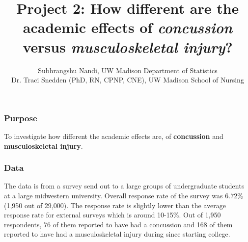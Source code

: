 \documentclass[12]{article}
\begin{document}

\doublespacing

\title{Project 2: How different are the academic effects of {\emph{concussion}} versus {\emph{musculoskeletal injury}}?}
\author{Subhrangshu Nandi, UW Madison Department of Statistics \\
Dr. Traci Snedden (PhD, RN, CPNP, CNE), UW Madison School of Nursing
}
\maketitle
\subsubsection*{Purpose}
To investigate how different the academic effects are, of {\bf{concussion}} and {\bf{musculoskeletal injury}}. 

\subsubsection*{Data}
The data is from a survey send out to a large groups of undergraduate students at a large midwestern 
university. Overall response rate of the survey was $6.72\%$ (1,950 out of 29,000). The response rate is slightly lower than the average response rate for external surveys which is around 10-15\%. Out of 1,950 respondents, 76 of them reported to have had a concussion and 168 of them reported to have had a musculoskeletal injury during since starting college. 
\end{document}
